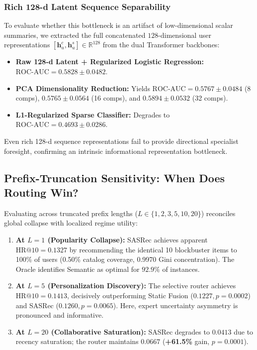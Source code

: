 \subsubsection{Rich 128-d Latent Sequence Separability}
To evaluate whether this bottleneck is an artifact of low-dimensional scalar summaries, we extracted the full concatenated $128$-dimensional user representations $[\mathbf{h}_u^c, \mathbf{h}_u^s] \in \mathbb{R}^{128}$ from the dual Transformer backbones:
\begin{itemize}[leftmargin=*]
    \item \textbf{Raw 128-d Latent + Regularized Logistic Regression:} $\text{ROC-AUC} = \mathbf{0.5828 \pm 0.0482}$.
    \item \textbf{PCA Dimensionality Reduction:} Yields $\text{ROC-AUC} = 0.5767 \pm 0.0484$ (8 comps), $0.5765 \pm 0.0564$ (16 comps), and $0.5894 \pm 0.0532$ (32 comps).
    \item \textbf{L1-Regularized Sparse Classifier:} Degrades to $\text{ROC-AUC} = 0.4693 \pm 0.0286$.
\end{itemize}
Even rich 128-d sequence representations fail to provide directional specialist foresight, confirming an intrinsic informational representation bottleneck.

\subsection{Prefix-Truncation Sensitivity: When Does Routing Win?}
\label{sec:prefix}

Evaluating across truncated prefix lengths ($L \in \{1, 2, 3, 5, 10, 20\}$) reconciles global collapse with localized regime utility:
\begin{enumerate}[leftmargin=*]
    \item \textbf{At $L=1$ (Popularity Collapse):} SASRec achieves apparent $\text{HR@10} = 0.1327$ by recommending the identical 10 blockbuster items to 100\% of users (0.50\% catalog coverage, 0.9970 Gini concentration). The Oracle identifies Semantic as optimal for $92.9\%$ of instances.
    \item \textbf{At $L=5$ (Personalization Discovery):} The selective router achieves $\text{HR@10} = \mathbf{0.1413}$, decisively outperforming Static Fusion ($0.1227, p=0.0002$) and SASRec ($0.1260, p=0.0065$). Here, expert uncertainty asymmetry is pronounced and informative.
    \item \textbf{At $L=20$ (Collaborative Saturation):} SASRec degrades to $0.0413$ due to recency saturation; the router maintains $0.0667$ (\textbf{+61.5\%} gain, $p=0.0001$).
\end{enumerate}

